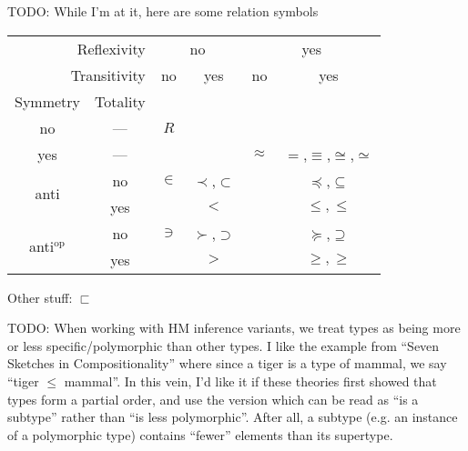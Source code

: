 \documentclass[11pt]{article} %
\theoremstyle{definition}
\theoremstyle{remark}
\begin{document}
TODO: While I'm at it, here are some relation symbols
\begin{center}
\begin{tabular}{cc|cccc}
\multicolumn{2}{r|}{Reflexivity}     & \multicolumn{2}{c}{no} & \multicolumn{2}{c}{yes} \\
\multicolumn{2}{r|}{Transitivity} & no & yes & no & yes \\
Symmetry & Totality \\
\hline
no & --- & $R$ \\
yes & --- &  & & $\approx$ & $=$,$\equiv$,$\cong$,$\simeq$  \\
\multirow{2}{*}{anti} & no & $\in$ & $\prec$,$\subset$ & & $\preceq$,$\subseteq$ \\
 & yes                    & & $<$ & & $\leq,\leqslant$ \\
\multirow{2}{*}{anti$^\text{op}$} & no & $\ni$ & $\succ$,$\supset$ & & $\succeq$,$\supseteq$ \\
 & yes                    & & $>$ & & $\geq,\geqslant$ \\
\end{tabular}
\end{center}
Other stuff: $\sqsubset$

TODO:
When working with HM inference variants, we treat types as being more or less specific/polymorphic than other types.
I like the example from ``Seven Sketches in Compositionality'' where since a tiger is a type of mammal, we say ``tiger $\leq$ mammal''.
In this vein, I'd like it if these theories first showed that types form a partial order, and use the version which can be read as ``is a subtype'' rather than ``is less polymorphic''.
After all, a subtype (e.g. an instance of a polymorphic type) contains ``fewer'' elements than its supertype.
\end{document}
